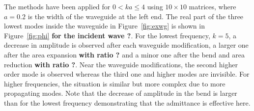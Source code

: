 \documentclass[numreferences]{kluwer}
\begin{document}
The methods have been applied for $0<ka\le4$ using $10\times10$ matrices, where $a=0.2$ is
the width of the waveguide at the left end. The real part of the three lowest modes inside the waveguide in Figure~\ref{fig:exwg} is shown in Figure~\ref{fig:phi} \textbf{for the incident wave ?}. For the lowest frequency, $k=5$, a decrease in amplitude is observed after each waveguide modification, a larger one after the area expansion \textbf{with ratio ?} and a minor one after the bend and area reduction \textbf{with ratio ?}. Near the waveguide modifications, the second higher order mode is observed whereas the third one and higher modes are invisible. For higher frequencies, the situation is similar but more complex due to more propagating modes. Note that the decrease of amplitude in the bend is larger than for the lowest frequency demonstrating that the admittance is effective here.
\end{document}
